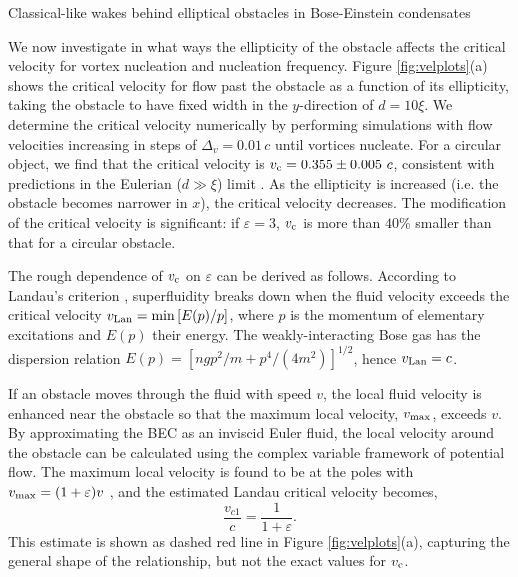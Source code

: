 \begin{chapter}{\label{cha:wake}Classical-like wakes behind elliptical obstacles in Bose-Einstein condensates}
\begin{figure}
{}
\end{figure} 
We now investigate in what ways the ellipticity of the obstacle affects the critical velocity for vortex nucleation and nucleation frequency.  Figure \ref{fig:velplots}(a) shows the critical velocity for flow past the obstacle as a function of its ellipticity, taking the obstacle to have fixed width in the $y$-direction of $d=10\xi$.  We determine the critical velocity numerically by performing simulations with flow velocities increasing in steps of $\Delta_v=0.01\,c$ until vortices nucleate.  
For a circular object, we find that the critical velocity is $v_{\rm c}=0.355\pm 0.005~c$, consistent with predictions in the Eulerian ($d \gg \xi$) limit \cite{berloff2000,rica2001,pham2004}.  As the ellipticity is increased (i.e. the obstacle becomes narrower in $x$), the critical velocity decreases.  The modification of the critical velocity is significant: if $\varepsilon=3$, $v_{\rm c}$ is more than $40\%$ smaller than that for a circular obstacle. 

The rough dependence of $v_{\rm c}$ on $\varepsilon$ can be derived as follows.   According to Landau's criterion \cite{NozieresPines},  superfluidity breaks down when the fluid velocity exceeds the critical velocity $v_{\rm Lan}=\min \left[E(p)/p\right]$, where $p$ is the momentum of elementary excitations and $E(p)$ their energy.   The weakly-interacting Bose gas has the dispersion relation $E(p)=[ngp^2/m + p^4/(4m^2)]^{1/2}$, hence $v_{\rm Lan}=c$.

If an obstacle moves through the fluid with speed $v$, the local fluid velocity is enhanced near the obstacle so that the maximum local velocity, $v_{\rm max}$, exceeds $v$. By approximating the BEC as an inviscid Euler fluid, the local velocity around the obstacle can be calculated using the complex variable framework of potential flow. The maximum local velocity is found to be at the poles with $v_{\rm max}=(1+\varepsilon)v$ \cite{Schlichting42}, and the estimated Landau critical velocity becomes,
\begin{equation}
\frac{v_{c1}}{c} = \frac{1}{1+\varepsilon}.
\label{eq:crit1}
\end{equation}
This estimate is shown as dashed red line in Figure \ref{fig:velplots}(a), capturing the general shape of the relationship, but not the exact values for $v_{\rm c}$.


\end{chapter}
